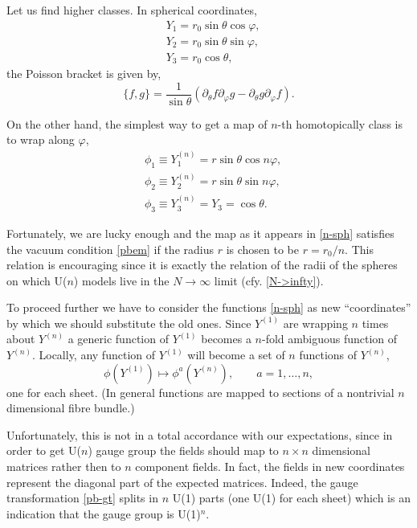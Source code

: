 \documentclass[a4paper]{article}
\newcommand{\pd}{\partial}
\begin{document}
Let us find higher classes. In spherical coordinates,
\begin{subequations}\label{sph}
\begin{align}
& Y_1=r_0\sin\theta\cos\varphi,\\
& Y_2=r_0\sin\theta\sin\varphi,\\
& Y_3=r_0\cos\theta,
\end{align}
\end{subequations}
the Poisson bracket is given by,
\begin{equation}
\{f,g\}=\frac{1}{\sin\theta}(\pd_\theta f\pd_\varphi g-
\pd_\theta g\pd_\varphi f).
\end{equation}

On the other hand, the simplest way to get a map of $n$-th
homotopically class is to wrap along $\varphi$,
\begin{subequations}\label{n-sph}
\begin{align}
& \phi_1\equiv Y_1^{(n)}=r\sin\theta\cos n\varphi,\\
& \phi_2\equiv Y_2^{(n)}=r\sin\theta\sin n\varphi,\\
& \phi_3\equiv Y_3^{(n)}=Y_3=\cos\theta.
\end{align}
\end{subequations}

Fortunately, we are lucky enough and the map as it appears in
\eqref{n-sph}  satisfies the vacuum condition \eqref{pbem} if the
radius $r$ is chosen to be $r=r_0/n$. This relation is encouraging
since it is exactly the relation of the radii of the spheres on which
U($n$) models live in the $N\to\infty$ limit (cfy. \eqref{N->infty}).

To proceed further we have to consider the functions \eqref{n-sph}
as new ``coordinates'' by which we should substitute the old ones.
Since $Y^{(1)}$ are wrapping $n$ times about $Y^{(n)}$ a generic
function of $Y^{(1)}$ becomes a $n$-fold ambiguous function of
$Y^{(n)}$. Locally, any function of $Y^{(1)}$ will become a set of
$n$ functions of $Y^{(n)}$,
\begin{equation}
\phi(Y^{(1)})\mapsto \phi^a(Y^{(n)}),\qquad a=1,\dots,n,
\end{equation}
one for each sheet. (In general functions are mapped to sections of a
nontrivial $n$ dimensional fibre bundle.)

Unfortunately, this is not in a total accordance with our
expectations, since in order to get U($n$) gauge group the fields
should map to $n\times n$ dimensional matrices rather then to $n$
component fields. In fact, the fields in new coordinates represent
the diagonal part of the expected matrices. Indeed, the gauge
transformation \eqref{pb-gt} splits in $n$ U(1) parts (one U(1)
for each sheet) which is an indication that the gauge group is
U(1)$^n$.
\end{document}
